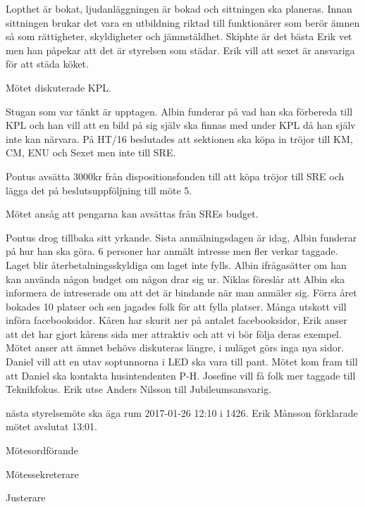 \documentclass[10pt]{article}
\def\mo{Erik Månsson}
\def\ms{Johan Karlberg}
\def\ji{Pontus Landgren}
\begin{document}
\begin{paragrafer}
Lopthet är bokat, ljudanläggningen är bokad och sittningen ska planeras.
Innan sittningen brukar det vara en utbildning riktad till funktionärer som berör ämnen så som rättigheter, skyldigheter och jämnstäldhet.
Skiphte är det bästa Erik vet men han påpekar att det är styrelsen som städar.
Erik vill att sexet är ansvariga för att städa köket.

Mötet diskuterade KPL.

Stugan som var tänkt är upptagen.
Albin funderar på vad han ska förbereda till KPL och han vill att en bild på sig själv ska finnas med under KPL då han själv inte kan närvara.
På HT/16 beslutades att sektionen ska köpa in tröjor till KM, CM, ENU och Sexet men inte till SRE.

Pontus \ypa avsätta 3000kr från dispositionsfonden till att köpa tröjor till SRE och lägga det på beslutsuppföljning till möte 5.

Mötet ansåg att pengarna kan avsättas från SREs budget.

Pontus drog tillbaka sitt yrkande.
Sista anmälningsdagen är idag, Albin funderar på hur han ska göra. 6 personer har anmält intresse men fler verkar taggade.
Laget blir återbetalningsskyldiga om laget inte fylls.
Albin ifrågasätter om han kan använda någon budget om någon drar sig ur.
Niklas föreslår att Albin ska informera de intreserade om att det är bindande när man anmäler sig. Förra året bokades 10 platser och sen jagades folk för att fylla platser.
Många utskott vill införa facebooksidor.
Kåren har skurit ner på antalet facebooksidor, Erik anser att det har gjort kårens sida mer attraktiv och att vi bör följa deras exempel.
Mötet anser att ämnet behövs diskuteras längre, i nuläget görs inga nya sidor.
Daniel vill att en utav soptunnorna i LED ska vara till pant.
Mötet kom fram till att Daniel ska kontakta husintendenten P-H.
Josefine vill få folk mer taggade till Teknikfokus.
Erik \ypa utse Anders Nilsson till Jubileumsansvarig.

\Mbaby
{}
{\Mba} nästa styrelsemöte ska äga rum 2017-01-26 12:10 i 1426.
{\Ibfu}
{\mo} förklarade mötet avslutat 13:01.
\end{paragrafer}

\hidesignfoot
\begin{signatures}{3}
\signature{\mo}{Mötesordförande}
\signature{\ms}{Mötessekreterare}
\signature{\ji}{Justerare}
\end{signatures}
\end{document}
